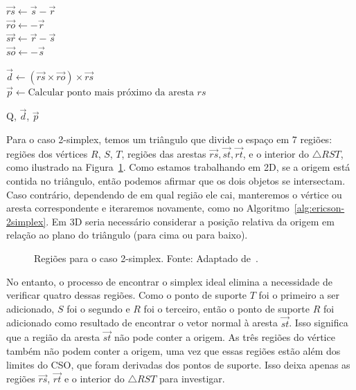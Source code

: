  \begin{algorithm}[htb]
	\caption{Caso 1-simplex}

	$\vec{rs} \leftarrow \vec s - \vec r$ \\
	$\vec{ro} \leftarrow -\vec r$ \\
	$\vec{sr} \leftarrow \vec r - \vec s$ \\
	$\vec{so} \leftarrow -\vec s$ \\



	$\vec d \leftarrow (\vec{rs} \times \vec{ro}) \times \vec{rs}$ \\
	$\vec p \leftarrow \text{Calcular ponto mais próximo da aresta } rs $ 

	\Return Q, $\vec d$, $\vec p$ 
	\label{alg:ericson-1simplex}
\end{algorithm}


Para o caso 2-simplex, temos um triângulo que divide o espaço em 7 regiões: regiões dos vértices $R$, $S$, $T$, regiões das arestas $\vec{rs}, \vec{st}, \vec{rt}$, 
e o interior do $\triangle RST$, como ilustrado na Figura~\ref{fig:gjk-ericson-2simplex}. Como estamos trabalhando em 2D, se a origem está contida no triângulo, então podemos afirmar que os dois objetos se intersectam. Caso contrário, dependendo de em qual região ele cai, manteremos o vértice ou aresta correspondente e iteraremos novamente, como no Algoritmo~\ref{alg:ericson-2simplex}. Em 3D seria necessário considerar a posição relativa da origem em relação ao plano do triângulo (para cima ou para baixo).
\begin{figure}[htb]
	\centering
	
	\caption{Regiões para o caso 2-simplex. Fonte: Adaptado de~\cite{muratori2016implementingGJK}.}
	\label{fig:gjk-ericson-2simplex}
\end{figure}

No entanto, o processo de encontrar o simplex ideal elimina a necessidade de verificar quatro dessas regiões. Como o ponto de suporte $T$ foi o primeiro a ser adicionado, $S$ foi o segundo e $R$ foi o terceiro, então o ponto de suporte $R$ foi adicionado como resultado de encontrar o vetor normal à aresta $\vec{st}$. Isso significa que a região da aresta $\vec{st}$ não pode conter a origem. As três regiões do vértice também não podem conter a origem, uma vez que essas regiões estão além dos limites do CSO, que foram derivadas dos pontos de suporte. Isso deixa apenas as regiões $\vec{rs}$, $\vec{rt}$ e o interior do $\triangle RST$ para investigar.

